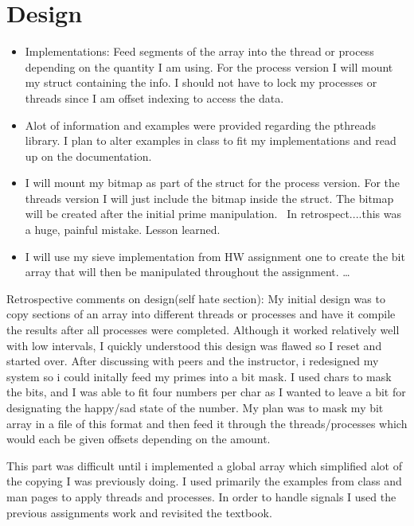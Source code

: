\documentclass[letterpaper,10pt,titlepage]{article}
\begin{document}
\section{Design}


\begin{itemize} 
\item Implementations: Feed segments of the array into the thread or process depending on the quantity I am
using. For the process version I will mount my struct containing the info. I should not have to lock my processes
or threads since I am offset indexing to access the data.

\item Alot of information and examples were provided regarding the pthreads library. I plan to alter examples in class 
to fit my implementations and read up on the documentation.

\item I will mount my bitmap as part of the struct for the process version. For the threads version I will just include the bitmap inside the struct.
The bitmap will be created after the initial prime manipulation. ~In retrospect....this was a huge, painful mistake. Lesson learned.

\item I will use my sieve implementation from HW assignment one to create the bit array that will then be manipulated throughout the assignment.
\ldots 
\end{itemize}

Retrospective comments on design(self hate section):
	My initial design was to copy sections of an array into different threads or processes and have it compile the results after all processes were
	completed. Although it worked relatively well with low intervals, I quickly understood this design was flawed so I reset and started over.
	After discussing with peers and the instructor, i redesigned my system so i could initally feed my primes into a bit mask. I used chars to mask the bits,
	and I was able to fit four numbers per char as I wanted to leave a bit for designating the happy/sad state of the number. 
	My plan was to mask my bit array in a file of this format and then feed it through the threads/processes which would each be given offsets depending on the amount.
	
	This part was difficult until i implemented a global array which simplified alot of the copying I was previously doing. 
	I used primarily the examples from class and man pages to apply threads and processes. In order to handle signals I used the previous assignments work and revisited 
	the textbook.
	
\end{document}
